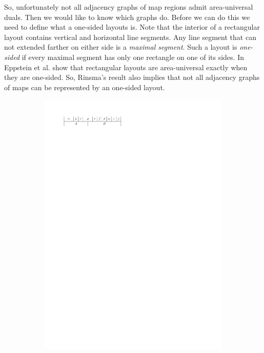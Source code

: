   So, unfortunately not all adjacency graphs of map regions admit area-universal duals.
  Then we would like to know which graphs do.
  Before we can do this we need to define what a one-sided layouts is.
  Note that the interior of a rectangular layout contains vertical and horizontal line segments.
  Any line segment that can not extended farther on either side is a \emph{maximal segment}.
  Such a layout is \emph{one-sided} if every maximal segment has only one rectangle on one of its sides.
  In~\cite{Eppstein2012} Eppstein et al. show that rectangular layouts are area-universal exactly when they are one-sided.
  So, Rinsma's result also implies that not all adjacency graphs of maps can be represented by an one-sided layout.


  \begin{figure}[b]
    \quad
    \begin{subfigure}[b]{0.45 \textwidth}
      \centering
      \includegraphics[width=\textwidth]{introduction/img/2sidedBefore.pdf}

\end{subfigure}
\end{figure}
